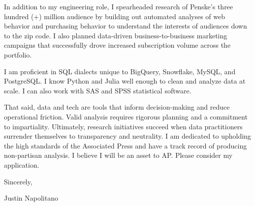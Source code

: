 \documentclass{cover-letter-class}
\begin{document}
{    \vspace{1em}


    \vspace{1em}
    In addition to my engineering role, I spearheaded research of Penske's three hundred (+) million audience by building out automated analyses of web behavior and purchasing behavior to understand the interests of audiences down to the zip code. I also planned data-driven business-to-business marketing campaigns that successfully drove increased subscription volume across the portfolio.
    
    \vspace{1em}

    I am proficient in SQL dialects unique to BigQuery, Snowflake, MySQL, and PostgreSQL. I know Python and Julia well enough to clean and analyze data at scale. I can also work with SAS and SPSS statistical software.  
    
    \vspace{1em}

    That said, data and tech are tools that inform decision-making and reduce operational friction. Valid analysis requires rigorous planning and a commitment to impartiality. Ultimately, research initiatives succeed when data practitioners surrender themselves to transparency and neutrality. I am dedicated to upholding the high standards of the Associated Press and have a track record of producing non-partisan analysis. I believe I will be an asset to AP. Please consider my application.
    

    \vspace{1em}


    \vspace{1em}

    \noindent
    Sincerely,

    \vspace{1em}

    \noindent
    Justin Napolitano
}
\end{document}
